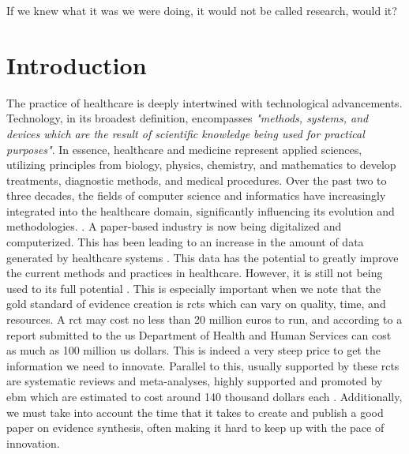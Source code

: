 \begin{savequote}[75mm]
If we knew what it was we were doing, it would not be called research, would it?
\end{savequote}
\chapter{Introduction} \label{chap:intro}

\acresetall

The practice of healthcare is deeply intertwined with technological advancements. Technology, in its broadest definition, encompasses \textit{"methods, systems, and devices which are the result of scientific knowledge being used for practical purposes"}. In essence, healthcare and medicine represent applied sciences, utilizing principles from biology, physics, chemistry, and mathematics to develop treatments, diagnostic methods, and medical procedures. Over the past two to three decades, the fields of computer science and informatics have increasingly integrated into the healthcare domain, significantly influencing its evolution and methodologies. \cite{adler-milsteinHITECHActDrove2017}. A paper-based industry is now being digitalized and computerized. This has been leading to an increase in the amount of data generated by healthcare systems \cite{kruseUseElectronicHealth2018,palabindalaAdoptionElectronicHealth2016}. 
This data has the potential to greatly improve the current methods and practices in healthcare. However, it is still not being used to its full potential \cite{kruseUseElectronicHealth2018,dicamilloGuestEditorialData2020}. This is especially important when we note that the gold standard of evidence creation is \acp{rct} which can vary on quality, time, and resources. A \ac{rct} may cost no less than 20 million euros to run, and according to a report submitted to the \ac{us} Department of Health and Human Services \cite{sertkayaaylinEXAMINATIONCLINICALTRIAL2014} can cost as much as 100 million \ac{us} dollars. This is indeed a very steep price to get the information we need to innovate. Parallel to this, usually supported by these \acp{rct} are systematic reviews and meta-analyses, highly supported and promoted by \ac{ebm} which are estimated to cost around 140 thousand dollars each \cite{michelsonSignificantCostSystematic2019}. Additionally, we must take into account the time that it takes to create and publish a good paper on evidence synthesis, often making it hard to keep up with the pace of innovation.

